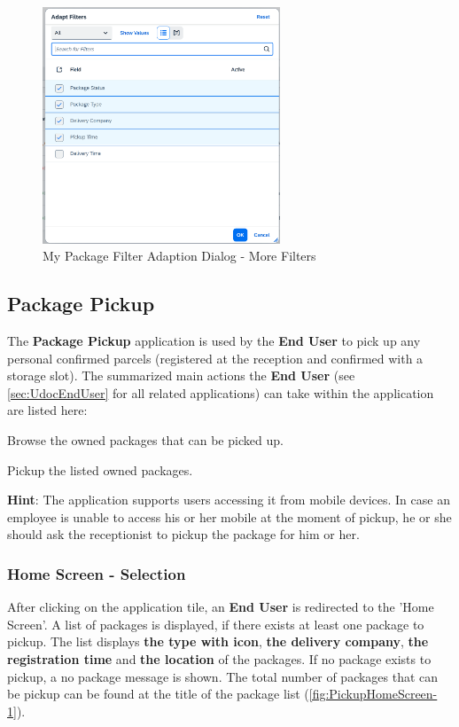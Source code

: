\begin{figure}[H]
	\centering
	\includegraphics[height=200pt]{images/user_doc/myPack/MoreFIlterOption.png}
	\caption{My Package Filter Adaption Dialog - More Filters}
	\label{fig:mpMOreFilterAdaption}
\end{figure}
% 

\subsection{Package Pickup}
\label{subsec:pp}

The \textbf{Package Pickup} application is used by the \textbf{End User} to pick up any personal confirmed parcels (registered at the reception and confirmed with a storage slot). 
The summarized main actions the \textbf{End User} (see \autoref{sec:UdocEndUser} for all related applications) can take within the application are listed here:

\begin{compactenum}
	\item Browse the owned packages that can be picked up.
    \item Pickup the listed owned packages.
\end{compactenum}

\bigskip
\textbf{Hint}: The application supports users accessing it from mobile devices. In case an employee is unable to access his or her mobile at the moment of pickup, he or she should ask the receptionist to pickup the package for him or her.


\subsubsection{Home Screen - Selection}
After clicking on the application tile, an \textbf{End User} is redirected to the 'Home Screen'. A list of packages is displayed, if there exists at least one package to pickup. 
The list displays \textbf{the type with icon}, \textbf{the delivery company}, \textbf{the registration time} and \textbf{the location} of the packages. 
If no package exists to pickup, a no package message is shown. 
The total number of packages that can be pickup can be found at the title of the package list (\autoref{fig:PickupHomeScreen-1}).


